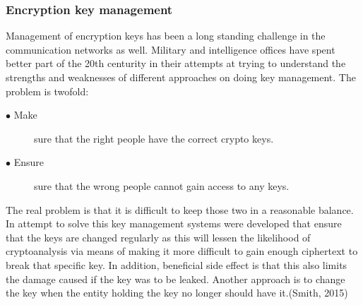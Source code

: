\documentclass{article}
\begin{document}
\subsubsection{Encryption key management}
Management of encryption keys has been a long standing challenge in the communication networks as well. Military and intelligence offices have spent better part of the 20th centurity in their attempts at trying to understand the strengths and weaknesses of different approaches on doing key management. The problem is twofold:
\begin{description}
	\item[$\bullet$ Make] sure that the right people have the correct crypto keys.
	\item[$\bullet$ Ensure] sure that the wrong people cannot gain access to any keys.
\end{description} 
The real problem is that it is difficult to keep those two in a reasonable balance. In attempt to solve this key management systems were developed that ensure that the keys are changed regularly as this will lessen the likelihood of cryptoanalysis via means of making it more difficult to gain enough ciphertext to break that specific key. In addition, beneficial side effect is that this also limits the damage caused if the key was to be leaked. Another approach is to change the key when the entity holding the key no longer should have it.(Smith, 2015) 
\end{document}
